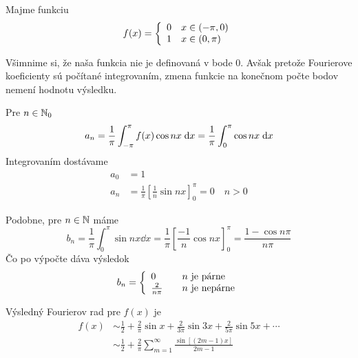 \begin{priklad}
Majme funkciu
    \begin{equation}
        f(x) = \left\{
            \begin{array}{l l}
                0 \quad x \in (-\pi,0) \\
                1 \quad x \in (0,\pi)
            \end{array}
        \right.
    \end{equation}
    
    \begin{poznamka}
        Všimnime si, že naša funkcia nie je definovaná v bode 0.
        Avšak pretože Fourierove koeficienty sú počítané integrovaním,
        zmena funkcie na konečnom počte bodov nemení hodnotu výsledku.
    \end{poznamka}

    Pre $n \in \mathbb{N}_0$
    \begin{equation}
        a_n = \frac{1}{\pi} \int_{-\pi}^{\pi} f(x) \cos nx \; \mathrm{d} x =
        \frac{1}{\pi} \int_0^{\pi} \cos nx \; \mathrm{d} x
    \end{equation}
    Integrovaním dostávame
    \begin{equation}
    \begin{split}
        a_0 &= 1 \\
        a_n &= \frac{1}{\pi} \left[ \frac{1}{n} \sin nx
        \right]_0^{\pi} = 0 \quad n>0        
    \end{split}
    \end{equation}

    Podobne, pre $n\in \mathbb{N}$ máme
    \begin{equation}
        b_n = \frac{1}{\pi} \int_0^{\pi} \sin nx \dd x =
           \frac{1}{\pi} \left[ \frac{-1}{n} \cos nx \right]_0^{\pi} =
           \frac{1 - \cos n\pi}{n\pi}
    \end{equation}
    Čo po výpočte dáva výsledok
    \begin{equation}
        b_n = \left\{
                \begin{array}{l l}
                    0 \quad & n \text{ je párne} \\
                    \frac{2}{n\pi}  \quad &n \text{ je nepárne}
                \end{array}
            \right.
    \end{equation}

    Výsledný Fourierov rad pre $f(x)$ je 
    \begin{equation}
    \begin{split}
        f(x) &\sim \frac{1}{2} + \frac{2}{\pi} \sin x + \frac{2}{3\pi}
            \sin 3x + \frac{2}{5\pi} \sin 5x + \cdots \\
            &\sim \frac{1}{2} + \frac{2}{\pi} \sum_{m=1}^{\infty}
                \frac{\sin\left[ (2m-1) x\right]}{2m-1}
    \end{split}
    \end{equation}


\end{priklad}
